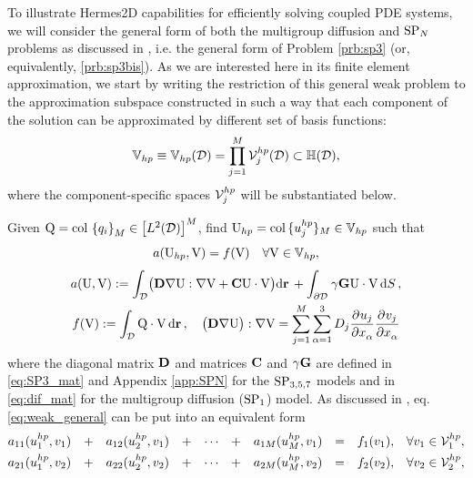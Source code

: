 To illustrate Hermes2D capabilities for efficiently solving coupled PDE systems, we will consider the general form of
both the multigroup diffusion and $\SPN$ problems as discussed in , i.e. the general form of Problem
\ref{prb:sp3} (or, equivalently, \ref{prb:sp3bis}). As we are interested here in its finite element approximation, we
start by writing the restriction of this general weak problem to the approximation subspace constructed in such a
way that each component of the solution can be approximated by different set of basis functions:
$$ 
	\mathbb{V}_{hp} \equiv \mathbb{V}_{hp}(\VV) = \prod_{j=1}^M \Space_{j}^{hp}(\VV) \subset \mathbb{H}(\VV),
$$
where the component-specific spaces $\Space^{hp}_{j}$ will be substantiated below. \\
\begin{problem}\label{prb:general}
Given $\mathrm{Q} = \colset{q_i}{M} \in \left[\Lp[2](\VV)\right]^M$, find $\U_{hp} = \col \{u_{j}^{hp}\}_M \in
\mathbb{V}_{hp}$ such that
\begin{equation}\label{eq:weak_general}
\begin{gathered}
	a(\U_{hp}, \mathrm{V}) = f(\mathrm{V}) \quad \forall \mathrm{V}\in \mathbb{V}_{hp},\\[.3em]
	a(\mathrm{U}, \mathrm{V}) := \int_{\VV} \bigl(\mat{D}\nabla\mathrm{U} : \nabla \mathrm{V} +
	\mat{C} \mathrm{U}\cdot\mathrm{V}\bigr)\d{\br} +  \int_{\pV} \gamma\mat{G}\mathrm{U}\cdot\mathrm{V}
	\,\d{S},\\
 	f(\mathrm{V}) := \int_{\VV}\mathrm{Q}\cdot\mathrm{V}\,\d{\br},\quad \bigl(\mat{D}\nabla\mathrm{U}\bigr) : \nabla
 	\mathrm{V} = \sum_{j=1}^M\sum_{\alpha=1}^3 D_j\pd{u_j}{x_\alpha}\pd{v_j}{x_\alpha}
\end{gathered}
\end{equation}
where the diagonal matrix $\mat{D}$ and matrices $\mat{C}$ and $\gamma\mat{G}$ are defined in \eqref{eq:SP3_mat} and
Appendix \ref{app:SPN} for the  $\SPN[3,5,7]$ models and in \eqref{eq:dif_mat} for the multigroup diffusion ($\SPN[1]$)
model. As discussed in , eq. \eqref{eq:weak_general} can be put into an equivalent form \\[.2em]
\begin{equation*}
\begin{matrix}
		\a{1}{1} 	& + & \b{1}{2} 	& + & \cdots 	& + & \b{1}{M} 	& = & \l[1], &\forall v_1\in \Space_{1}^{hp}, \\[.35em]
		\b{2}{1} 	& + & \a{2}{2} 	& + & \cdots 	& + & \b{2}{M} 	& = & \l[2], &\forall v_2\in \Space_{2}^{hp}, \\[.35em]

\end{matrix}
\end{equation*}
\end{problem}
